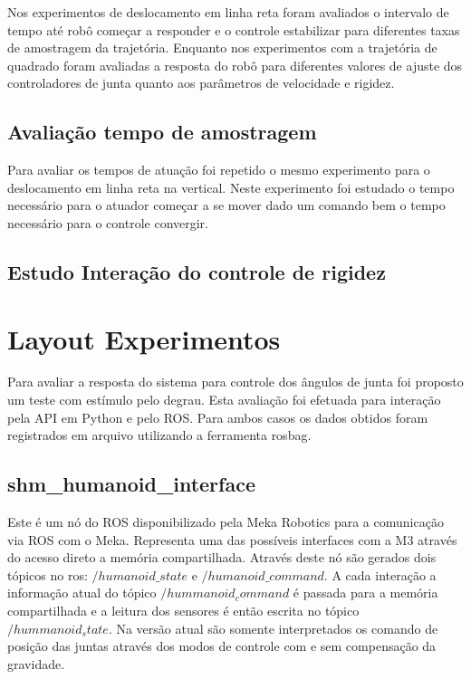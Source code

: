 Nos experimentos de deslocamento em linha reta foram avaliados o intervalo de tempo até robô começar a responder e o controle estabilizar para diferentes taxas de amostragem da trajetória. Enquanto nos experimentos com a trajetória de quadrado foram avaliadas a resposta do robô para diferentes valores de ajuste dos controladores de junta quanto aos parâmetros de velocidade e rigidez.

\subsection{Avaliação tempo de amostragem}

Para avaliar os tempos de atuação foi repetido o mesmo experimento para o deslocamento em linha reta na vertical. Neste experimento foi estudado o tempo necessário para o atuador começar a se mover dado um comando bem o tempo necessário para o controle convergir.


\subsection{Estudo Interação do controle de rigidez}

\section{Layout Experimentos}

Para avaliar a resposta do sistema para controle dos ângulos de junta foi proposto um teste com estímulo pelo degrau. Esta avaliação foi efetuada para interação pela API em Python e pelo ROS. Para ambos casos os dados obtidos foram registrados em arquivo utilizando a ferramenta rosbag. 





\subsection{shm\_humanoid\_interface}

Este é um nó do ROS disponibilizado pela Meka Robotics para a comunicação via ROS com o Meka. Representa uma das possíveis interfaces com a M3 através do acesso direto a memória compartilhada. Através deste nó são gerados dois tópicos no ros: $/humanoid\_state$ e $/humanoid\_command$. A cada interação a informação atual do tópico $/hummanoid_command$ é passada para a memória compartilhada e a leitura dos sensores é então escrita no tópico $/hummanoid_state$. Na versão atual são somente interpretados os comando de posição das juntas através dos modos de controle com e sem compensação da gravidade.

